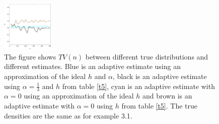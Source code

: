 \documentclass[
twoside,
openright,
titlepage,
numbers=noenddot,
headinclude,%
footinclude=true,
dottedtoc, %
ngerman,
american, %
pagesize=pdftex,
]{book}
\begin{document}
\begin{example}
\begin{figure}[H]
			\includegraphics[width=0.22\textwidth]{figures/2DTVexamples/e2sn+t2}
			\caption{The figure shows $TV(n)$ between different true distributions and different estimates. Blue is an adaptive estimate using an approximation of the ideal $h$ and $\alpha$, black is an adaptive estimate using $\alpha=\frac{1}{3}$ and $h$ from table \ref{t5}, cyan is an adaptive estimate with $\alpha=0$ using an approximation of the ideal $h$ and brown is an adaptive estimate with $\alpha=0$ using $h$ from table \ref{t5}. The true densities are the same as for example 3.1.}
			\label{fig:e7}
		\end{figure}
	\end{example}
	
\end{document}
